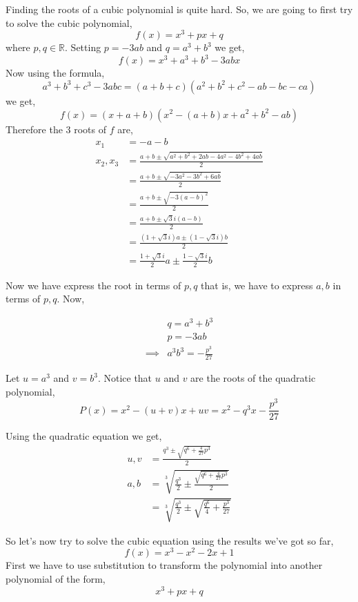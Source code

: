 Finding the roots of a cubic polynomial is quite hard. So, we are going to first try to solve the cubic polynomial,
\[
    f(x) = x^{3} + px + q
\]
where $p, q \in \mathbb{R}$.
Setting $p=-3ab$ and $q = a^{3} + b^{3}$ we get,
\[
    f(x) = x^{3} + a^{3} + b^{3} - 3abx
\]
Now using the formula,
\[
    a^{3} + b^{3} + c^{3} - 3abc = (a+b+c)(a^{2} + b^{2} + c^{2} - ab - bc - ca)
\]
we get,
\[
    f(x) = (x+a+b)(x^{2} -(a+b)x + a^{2} + b^{2} - ab)
\]
Therefore the 3 roots of $f$ are,
\begin{align*}
    x_{1}        &= -a-b \\
    x_{2}, x_{3} &= \frac{a+b \pm \sqrt{a^{2} + b^{2} + 2ab - 4a^{2} - 4b^{2} + 4ab}}{2}\\
                 &= \frac{a+b \pm \sqrt{-3a^{2} -3b^{2} + 6ab}}{2} \\
                 &= \frac{a+b \pm \sqrt{-3(a-b)^{2}}}{2} \\
                 &= \frac{a+b \pm \sqrt{3}i(a-b)}{2} \\
                 &= \frac{(1 + \sqrt{3}i)a \pm (1 - \sqrt{3}i)b}{2} \\
                 &= \frac{1+\sqrt{3}i}{2}a \pm \frac{1-\sqrt{3}i}{2}b
\end{align*}

Now we have express the root in terms of $p, q$ that is, we have to express $a,b$ in terms of $p,q$. Now,

\begin{align*}
         & q = a^{3} + b^{3} \\
         & p = -3ab \\
\implies & a^{3}b^{3} = -\frac{p^{3}}{27}
\end{align*}

Let $u=a^{3}$ and $v=b^{3}$. Notice that $u$ and $v$ are the roots of the quadratic polynomial,
\[
    P(x) = x^{2} - (u+v)x + uv = x^{2} - q^{3}x -\frac{p^{3}}{27} 
\]

Using the quadratic equation we get,
\begin{align*}
    u,v &= \frac{q^{3} \pm \sqrt{q^{6} + \frac{4}{27}p^{3}}}{2} \\
    a,b &= \sqrt[3]{\frac{q^{3}}{2} \pm \frac{\sqrt{q^{6} + \frac{4}{27}p^{3}}}{2}}\\
        &= \sqrt[3]{\frac{q^{3}}{2} \pm \sqrt{\frac{q^{6}}{4} + \frac{p^{3}}{27}}}
\end{align*}

So let's now try to solve the cubic equation using the results we've got so far,
\[
    f(x) = x^{3} - x^{2} - 2x + 1
\]
First we have to use substitution to transform the polynomial into another polynomial of the form,
\[
    x^{3} + px + q
\]

